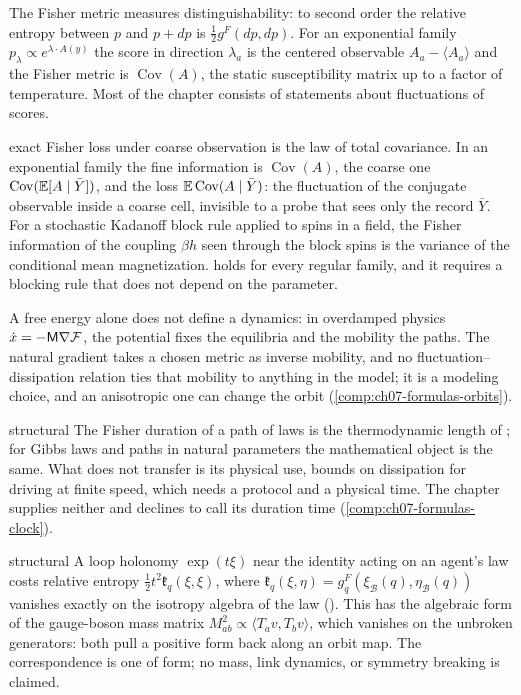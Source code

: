 The Fisher metric measures distinguishability: to second order the relative entropy between $p$ and
$p+dp$ is $\tfrac12g^F(dp,dp)$. For an exponential family $p_\lambda\propto e^{\lambda\cdot A(y)}$
the score in direction $\lambda_a$ is the centered observable $A_a-\langle A_a\rangle$ and the Fisher
metric is $\operatorname{Cov}(A)$, the static susceptibility matrix up to a factor of temperature.
Most of the chapter consists of statements about fluctuations of scores.

\begin{analogy}{exact}
Fisher loss under coarse observation is the law of total covariance. In an exponential family the
fine information is $\operatorname{Cov}(A)$, the coarse one $\operatorname{Cov}(\mathbb E[A\mid\bar Y])$,
and the loss $\mathbb E\operatorname{Cov}(A\mid\bar Y)$: the fluctuation of the conjugate observable inside
a coarse cell, invisible to a probe that sees only the record $\bar Y$. For a stochastic Kadanoff block
rule applied to spins in a field, the Fisher information of the coupling $\beta h$ seen through the
block spins is the variance of the conditional mean magnetization.  holds for every
regular family, and it requires a blocking rule that does not depend on the parameter.
\end{analogy}

A free energy alone does not define a dynamics: in overdamped physics
$\dot x=-\mathsf M\nabla\mathcal F$, the potential fixes the equilibria and the mobility the paths. The
natural gradient \citep{amari1998natural} takes a chosen metric as inverse mobility, and no
fluctuation--dissipation relation ties that mobility to anything in the model; it is a modeling
choice, and an anisotropic one can change the orbit (\cref{comp:ch07-formulas-orbits}).

\begin{analogy}{structural}
The Fisher duration of a path of laws is the thermodynamic length of \citet{Crooks2007}; for Gibbs
laws and paths in natural parameters the mathematical object is the same. What does not transfer is
its physical use, bounds on dissipation for driving at finite speed, which needs a protocol and a
physical time. The chapter supplies neither and declines to call its duration time
(\cref{comp:ch07-formulas-clock}).
\end{analogy}

\begin{analogy}{structural}
A loop holonomy $\exp(t\xi)$ near the identity acting on an agent's law costs relative entropy
$\tfrac12t^2\mathfrak k_q(\xi,\xi)$, where $\mathfrak k_q(\xi,\eta)=g^F_q(\xi_{\mathcal B}(q),
\eta_{\mathcal B}(q))$ vanishes exactly on the isotropy algebra of the law
(). This has the algebraic form of the gauge-boson mass matrix
$M^2_{ab}\propto\langle T_av,T_bv\rangle$, which vanishes on the unbroken generators: both pull a
positive form back along an orbit map. The correspondence is one of form; no mass, link dynamics, or
symmetry breaking is claimed.
\end{analogy}


